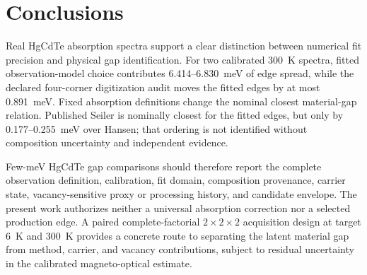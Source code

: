 \section{Conclusions}
\label{sec:conclusions}

Real HgCdTe absorption spectra support a clear distinction between numerical fit precision and physical gap identification. For two calibrated 300~K spectra, fitted observation-model choice contributes 6.414--6.830~meV of edge spread, while the declared four-corner digitization audit moves the fitted edges by at most 0.891~meV. Fixed absorption definitions change the nominal closest material-gap relation. Published Seiler is nominally closest for the fitted edges, but only by 0.177--0.255~meV over Hansen; that ordering is not identified without composition uncertainty and independent evidence.

Few-meV HgCdTe gap comparisons should therefore report the complete observation definition, calibration, fit domain, composition provenance, carrier state, vacancy-sensitive proxy or processing history, and candidate envelope. The present work authorizes neither a universal absorption correction nor a selected production edge. A paired complete-factorial $2\times2\times2$ acquisition design at target 6~K and 300~K provides a concrete route to separating the latent material gap from method, carrier, and vacancy contributions, subject to residual uncertainty in the calibrated magneto-optical estimate.